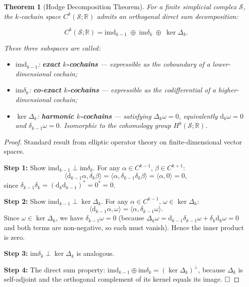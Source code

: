 \documentclass[12pt,a4paper]{article}
\theoremstyle{plain}
\newtheorem{theorem}{Theorem}
\theoremstyle{definition}
\theoremstyle{remark}
\newcommand{\R}{\mathbb{R}}
\newcommand{\im}{\mathrm{im}}
\newcommand{\dd}{\mathrm{d}}
\newcommand{\SSS}{\mathcal{S}}
\newcommand{\inner}[2]{\langle #1, #2 \rangle}
\begin{document}
\begin{theorem}[Hodge Decomposition Theorem]
\label{thm:hodge}
For a finite simplicial complex $\SSS$, the $k$-cochain space $C^k(\SSS; \R)$ admits an orthogonal direct sum decomposition:

\begin{equation}\label{eq:hodge_dec}
    C^k(\SSS; \R) = \im \dd_{k-1} \;\oplus\; \im \delta_k \;\oplus\; \ker \Delta_k.
\end{equation}

These three subspaces are called:
\begin{itemize}
    \item $\im \dd_{k-1}$: \textbf{exact $k$-cochains} --- expressible as the coboundary of a lower-dimensional cochain;
    \item $\im \delta_k$: \textbf{co-exact $k$-cochains} --- expressible as the codifferential of a higher-dimensional cochain;
    \item $\ker \Delta_k$: \textbf{harmonic $k$-cochains} --- satisfying $\Delta_k \omega = 0$, equivalently $\dd_k\omega = 0$ and $\delta_{k-1}\omega = 0$. Isomorphic to the cohomology group $H^k(\SSS; \R)$.
\end{itemize}
\end{theorem}

\begin{proof}
Standard result from elliptic operator theory on finite-dimensional vector spaces.

\textbf{Step 1:} Show $\im \dd_{k-1} \perp \im \delta_k$. For any $\alpha \in C^{k-1}$, $\beta \in C^{k+1}$:
\[
\inner{\dd_{k-1}\alpha}{\delta_k\beta} = \inner{\alpha}{\delta_{k-1}\delta_k\beta} = \inner{\alpha}{0} = 0,
\]
since $\delta_{k-1}\delta_k = (\dd_k \dd_{k-1})^* = 0^* = 0$.

\textbf{Step 2:} Show $\im \dd_{k-1} \perp \ker \Delta_k$. For any $\alpha \in C^{k-1}$, $\omega \in \ker \Delta_k$:
\[
\inner{\dd_{k-1}\alpha}{\omega} = \inner{\alpha}{\delta_{k-1}\omega}.
\]
Since $\omega \in \ker \Delta_k$, we have $\delta_{k-1}\omega = 0$ (because $\Delta_k\omega = \dd_{k-1}\delta_{k-1}\omega + \delta_k\dd_k\omega = 0$ and both terms are non-negative, so each must vanish). Hence the inner product is zero.

\textbf{Step 3:} $\im \delta_k \perp \ker \Delta_k$ is analogous.

\textbf{Step 4:} The direct sum property: $\im \dd_{k-1} \oplus \im \delta_k = (\ker \Delta_k)^\perp$, because $\Delta_k$ is self-adjoint and the orthogonal complement of its kernel equals its image. $\hfill\square$
\end{proof}
\end{document}
